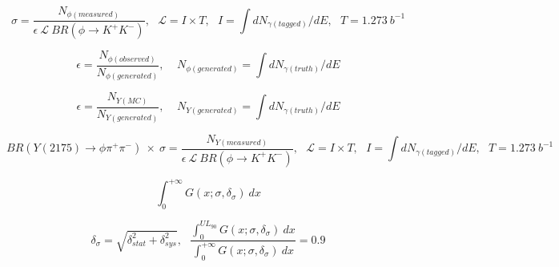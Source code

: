 \documentclass[12pt]{article}
\begin{document}
\begin{equation}
    \boxed{\sigma = \frac{N_{\phi(measured)}}{\epsilon~\mathcal{L}~BR(\phi\rightarrow K^{+}K^{-})},~~~ \mathcal{L}=I \times T,~~~ I=\int dN_{\gamma(tagged)}/dE,~~~ T = 1.273~b^{-1}} 
\end{equation}

\begin{equation} 
    \boxed{\epsilon=\frac{N_{\phi(observed)}}{N_{\phi(generated)}},~~~~~N_{\phi(generated)}=\int dN_{\gamma(truth)}/dE}
\end{equation}

\begin{equation} 
    \boxed{\epsilon=\frac{N_{Y(MC)}}{N_{Y(generated)}},~~~~~N_{Y(generated)}=\int dN_{\gamma(truth)}/dE}
\end{equation}

 \begin{equation}
    \boxed{BR(Y(2175)\rightarrow \phi \pi^{+} \pi^{-})~\times~\sigma = \frac{N_{Y(measured)}}{\epsilon~\mathcal{L}~BR(\phi\rightarrow K^{+}K^{-})},~~~ \mathcal{L}=I \times T,~~~ I=\int dN_{\gamma(tagged)}/dE,~~~ T = 1.273~b^{-1}}
\end{equation}

 \begin{equation}
    \int_{0}^{+\infty} G(x;\sigma,\delta_{\sigma})~dx
\end{equation}

 \begin{equation}
    \boxed{\delta_{\sigma}=\sqrt{\delta_{stat}^{2} + \delta_{sys}^{2}},~~~\frac{\int_{0}^{UL_{90}} G(x;\sigma,\delta_{\sigma})~dx}{\int_{0}^{+\infty} G(x;\sigma,\delta_{\sigma})~dx} = 0.9}
\end{equation}

\end{document}
